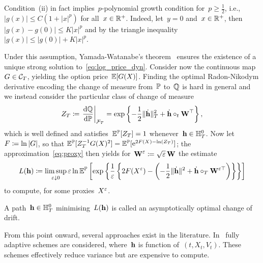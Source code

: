 \begin{remark}
Condition~(ii) in fact implies~$p$-polynomial growth condition for~$p\geq\frac{1}{2}$, i.e.,~$|g(x)|\leq C(1 + |x|^p)$ for all~$x\in\mathbb{R}^+$. Indeed, let~$y=0$ and~$x\in\mathbb{R}^+$, then~$|g(x)-g(0)|\leq K|x|^p$ and by the triangle inequality~$|g(x)|\leq|g(0)|+K|x|^p$.
\end{remark}
Under this assumption,
Yamada-Watanabe's theorem~\cite[Theorem 1]{Yamada1971OnEquations} ensures the existence of 
a unique strong solution to~\eqref{eq:log_price_dyn}.
Consider now the continuous map
$G\in\mathcal{C}_T$, 
yielding the option price~$\mathbb{E}[G(X)]$.
Finding the optimal Radon-Nikodym derivative encoding the change of measure from~$\mathbb{P}$ to~$\mathbb{Q}$ is hard in general and we instead consider the particular class of change of measure
\begin{equation}\label{eq:ZRadon}
Z_T\coloneqq \left.\frac{\mathrm{d} \mathbb{Q}}{\mathrm{d} \mathbb{P}}\right\vert_{\mathcal{F}_T} = \exp\left\{-\frac{1}{2}\|\dot{\boldsymbol{\mathrm{h}}}\|_{T}^2 + \dot{\boldsymbol{\mathrm{h}}}\circ_{t} \boldsymbol{\mathrm{W}}^\top \right\},
\end{equation}
which is well defined and satisfies~$\mathbb{E}^{\mathbb{P}}[Z_T]=1$
whenever~$\boldsymbol{\mathrm{h}} \in \mathbb{H}^0_T$.
Now let~$F \coloneqq \ln|G|$, so that
$\mathbb{E}^{\mathbb{P}}[Z_T^{-1} G(X)^2] = \mathbb{E}^{\mathbb{P}}[\mathrm{e}^{2F(X) - \ln(Z_T)}]$; 
the approximation~\eqref{eq:proxy} then yields for~$\boldsymbol{\mathrm{W}}^\varepsilon\coloneqq\sqrt{\varepsilon}\,\boldsymbol{\mathrm{W}}$ the estimate
\begin{equation}\label{eq:MinProblem}
L(\boldsymbol{\mathrm{h}})\coloneqq\limsup_{\varepsilon\downarrow 0}\varepsilon\ln\mathbb{E}^{\mathbb{P}}\left[\exp\left\{\frac{1}{\varepsilon}\left\{2F(X^\varepsilon) - \left(-\frac{1}{2}\|\dot{\boldsymbol{\mathrm{h}}}\|^2 + \dot{\boldsymbol{\mathrm{h}}}\circ_T\boldsymbol{\mathrm{W}}^{\varepsilon\top}\right)\right\}\right\}\right]
\end{equation}
to compute, for some proxies~$X^\varepsilon$.
\begin{definition}\label{def:asyoptdrift}
A path~$\boldsymbol{\mathrm{h}}\in \mathbb{H}_T^0$ 
minimising~$L(\boldsymbol{\mathrm{h}})$
is called an asymptotically optimal change of drift.
\end{definition}
From this point onward, several approaches exist in the literature. In~\cite{Dupuis2012ImportanceDiffusions, Hartmann2018ImportanceVariables, Dupuis2017ModerateEquations} fully adaptive schemes are considered, where~$\boldsymbol{\mathrm{h}}$ is function of~$(t, X_t, V_t)$. These schemes effectively reduce variance but are expensive to compute. 
